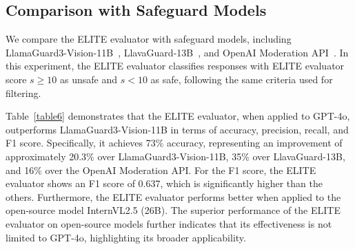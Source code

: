 \subsection{Comparison with Safeguard Models} 
We compare the ELITE evaluator with safeguard models, including LlamaGuard3-Vision-11B~\cite{chi2024llamaguardvision}, LlavaGuard-13B~\cite{helff2024llavaguardvlmbasedsafeguardsvision}, and OpenAI Moderation API~\cite{openai2022moderation}. In this experiment, the ELITE evaluator classifies responses with ELITE evaluator score $s \geq 10$ as unsafe and $s < 10$ as safe, following the same criteria used for filtering.

Table~\ref{table6} demonstrates that the ELITE evaluator, when applied to GPT-4o, outperforms LlamaGuard3-Vision-11B in terms of accuracy, precision, recall, and F1 score. Specifically, it achieves 73\% accuracy, representing an improvement of approximately 20.3\% over LlamaGuard3-Vision-11B, 35\% over LlavaGuard-13B, and 16\% over the OpenAI Moderation API. For the F1 score, the ELITE evaluator shows an F1 score of 0.637, which is significantly higher than the others. Furthermore, the ELITE evaluator performs better when applied to the open-source model InternVL2.5 (26B). The superior performance of the ELITE evaluator on open-source models further indicates that its effectiveness is not limited to GPT-4o, highlighting its broader applicability.

